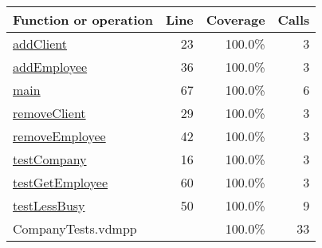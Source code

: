 \bigskip
\begin{longtable}{|l|r|r|r|}
\hline
Function or operation & Line & Coverage & Calls \\
\hline
\hline
\hyperref[addClient:23]{addClient} & 23&100.0\% & 3 \\
\hline
\hyperref[addEmployee:36]{addEmployee} & 36&100.0\% & 3 \\
\hline
\hyperref[main:67]{main} & 67&100.0\% & 6 \\
\hline
\hyperref[removeClient:29]{removeClient} & 29&100.0\% & 3 \\
\hline
\hyperref[removeEmployee:42]{removeEmployee} & 42&100.0\% & 3 \\
\hline
\hyperref[testCompany:16]{testCompany} & 16&100.0\% & 3 \\
\hline
\hyperref[testGetEmployee:60]{testGetEmployee} & 60&100.0\% & 3 \\
\hline
\hyperref[testLessBusy:50]{testLessBusy} & 50&100.0\% & 9 \\
\hline
\hline
CompanyTests.vdmpp & & 100.0\% & 33 \\
\hline
\end{longtable}

